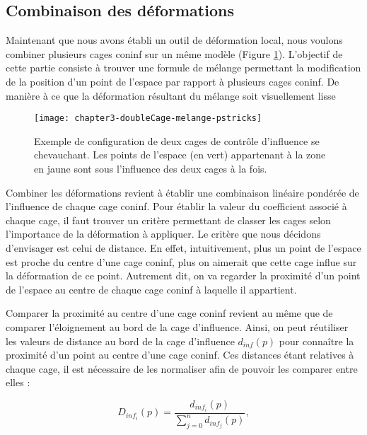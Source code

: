 \subsection{Combinaison des déformations}

Maintenant que nous avons établi un outil de déformation local, nous voulons
combiner plusieurs cages coninf sur un même modèle (Figure \ref{MELMC}).
L'objectif de cette partie consiste à trouver une formule de mélange
permettant la modification de la position d'un point de l'espace par rapport à
plusieurs cages coninf. De manière à ce que la déformation résultant du
mélange soit visuellement lisse

\begin{figure}[ht]
  \begin{center}
    \texttt{[image: chapter3-doubleCage-melange-pstricks]}

    \caption[Mélange de cages de contrôle d'influence] {Exemple de
configuration de deux cages de contrôle d'influence se chevauchant. Les points
de l'espace (en vert) appartenant à la zone en jaune sont sous l'influence des
deux cages à la fois.}

    \label{MELMC}
  \end{center}
\end{figure}

Combiner les déformations revient à établir une combinaison linéaire pondérée
de l'influence de chaque cage coninf. Pour établir la valeur du coefficient
associé à chaque cage, il faut trouver un critère permettant de classer les
cages selon l'importance de la déformation à appliquer. Le critère que nous
décidons d'envisager est celui de distance. En effet, intuitivement, plus
un point de l'espace est proche du centre d'une cage coninf, plus on aimerait
que cette cage influe sur la déformation de ce point. Autrement dit, on va
regarder la proximité d'un point de l'espace au centre de chaque cage coninf à
laquelle il appartient.

Comparer la proximité au centre d'une cage coninf revient au même que de
comparer l'éloignement au bord de la cage d'influence. Ainsi, on peut
réutiliser les valeurs de distance au bord de la cage d'influence $d_{inf}(p)$
pour connaître la proximité d'un point au centre d'une cage coninf. Ces
distances étant relatives à chaque cage, il est nécessaire de les normaliser
afin de pouvoir les comparer entre elles :

\begin{displaymath}
  D_{inf_i}(p) = \frac{d_{inf_i}(p)}{\sum_{j=0}^n d_{inf_j}(p)}, 
\end{displaymath}

